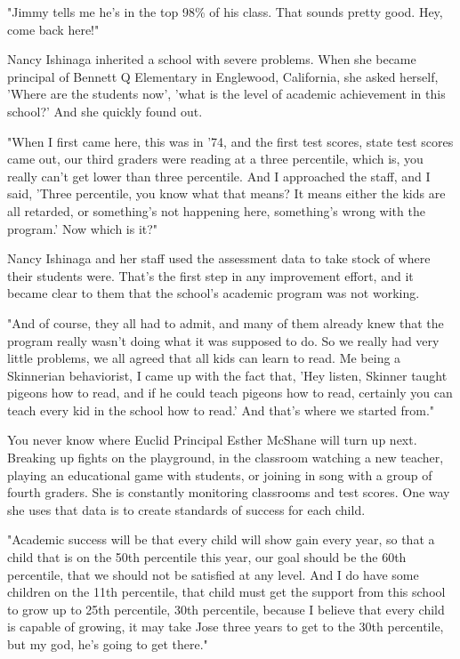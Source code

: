 "Jimmy tells me he's in the top 98\% of his class. That sounds pretty good. Hey, come back here!"

Nancy Ishinaga inherited a school with severe problems. When she became principal of Bennett Q Elementary in Englewood, California, she asked herself, 'Where are the students now', 'what is the level of academic achievement in this school?' And she quickly found out.

"When I first came here, this was in '74, and the first test scores, state test scores came out, our third graders were reading at a three percentile, which is, you really can't get lower than three percentile. And I approached the staff, and I said, 'Three percentile, you know what that means? It means either the kids are all retarded, or something's not happening here, something's wrong with the program.' Now which is it?"

Nancy Ishinaga and her staff used the assessment data to take stock of where their students were. That's the first step in any improvement effort, and it became clear to them that the school's academic program was not working.

"And of course, they all had to admit, and many of them already knew that the program really wasn't doing what it was supposed to do. So we really had very little problems, we all agreed that all kids can learn to read. Me being a Skinnerian behaviorist, I came up with the fact that, 'Hey listen, Skinner taught pigeons how to read, and if he could teach pigeons how to read, certainly you can teach every kid in the school how to read.' And that's where we started from."

You never know where Euclid Principal Esther McShane will turn up next. Breaking up fights on the playground, in the classroom watching a new teacher, playing an educational game with students, or joining in song with a group of fourth graders. She is constantly monitoring classrooms and test scores. One way she uses that data is to create standards of success for each child.

"Academic success will be that every child will show gain every year, so that a child that is on the 50th percentile this year, our goal should be the 60th percentile, that we should not be satisfied at any level. And I do have some children on the 11th percentile, that child must get the support from this school to grow up to 25th percentile, 30th percentile, because I believe that every child is capable of growing, it may take Jose three years to get to the 30th percentile, but my god, he's going to get there."

